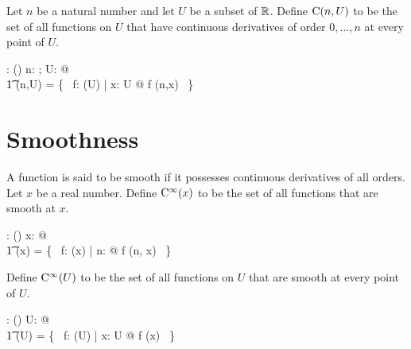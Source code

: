 \documentclass[11pt, oneside]{article}
\begin{document}
Let $n$ be a natural number and let $U$ be a subset of $\mathbb{R}$.
Define $\operatorname{C}(n,U)$ to be the set of all functions on $U$ that have continuous derivatives of order $0, \ldots, n$
at every point of $U$.
\begin{axdef}
	\CnPR: \nat \cross \power \R \fun \power(\R \pfun \R)
\where
	\forall n: \nat; U: \power \R @ \\
	\t1	\CnPR(n,U) = \{~ f: \FunPR(U) | \forall x: U @ f \in \CnR(n,x) ~\}
\end{axdef}

\section{Smoothness}

A function is said to be smooth if it possesses continuous derivatives of all orders.
Let $x$ be a real number.
Define $\operatorname{C^{\infty}}(x)$ to be the set of all functions that are smooth at $x$.
\begin{axdef}
	\smoothR: \R \fun \power(\R \pfun \R)
\where
	\forall x: \R @ \\
	\t1	\smoothR(x) = \{~ f: \FunR(x) | \forall n: \nat @ f \in \CnR(n, x) ~\}
\end{axdef}

Define $\operatorname{C^{\infty}}(U)$ to be the set of all functions on $U$ that are smooth at every point of $U$.
\begin{axdef}
	\smoothPR: \power \R \fun \power (\R \pfun \R)
\where
	\forall U: \power \R @ \\
	\t1	\smoothPR(U) = \{~ f: \FunPR(U) | \forall x: U @ f \in \smoothR(x) ~\}
\end{axdef}

\printbibliography
\end{document}
